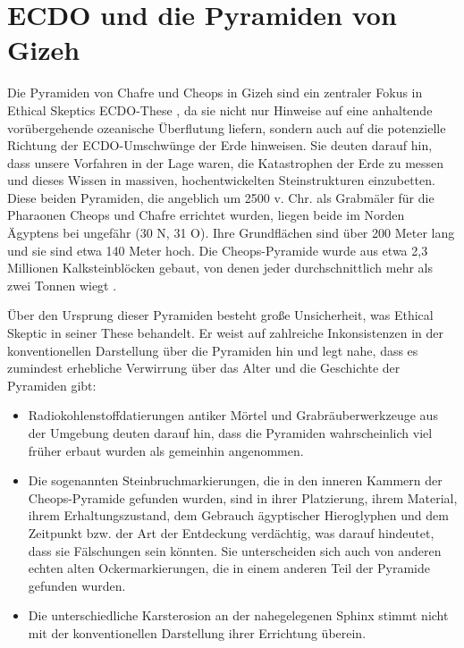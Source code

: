 \documentclass[10pt,twocolumn,letterpaper]{article}
\begin{document}
\section{ECDO und die Pyramiden von Gizeh}

Die Pyramiden von Chafre und Cheops in Gizeh sind ein zentraler Fokus in Ethical Skeptics ECDO-These \cite{27}, da sie nicht nur Hinweise auf eine anhaltende vorübergehende ozeanische Überflutung liefern, sondern auch auf die potenzielle Richtung der ECDO-Umschwünge der Erde hinweisen. Sie deuten darauf hin, dass unsere Vorfahren in der Lage waren, die Katastrophen der Erde zu messen und dieses Wissen in massiven, hochentwickelten Steinstrukturen einzubetten. Diese beiden Pyramiden, die angeblich um 2500 v. Chr. als Grabmäler für die Pharaonen Cheops und Chafre errichtet wurden, liegen beide im Norden Ägyptens bei ungefähr (30 N, 31 O). Ihre Grundflächen sind über 200 Meter lang und sie sind etwa 140 Meter hoch. Die Cheops-Pyramide wurde aus etwa 2,3 Millionen Kalksteinblöcken gebaut, von denen jeder durchschnittlich mehr als zwei Tonnen wiegt \cite{24, 25}.

Über den Ursprung dieser Pyramiden besteht große Unsicherheit, was Ethical Skeptic in seiner These behandelt. Er weist auf zahlreiche Inkonsistenzen in der konventionellen Darstellung über die Pyramiden hin und legt nahe, dass es zumindest erhebliche Verwirrung über das Alter und die Geschichte der Pyramiden gibt:

\begin{flushleft}
\begin{itemize}
    \item Radiokohlenstoffdatierungen antiker Mörtel und Grabräuberwerkzeuge aus der Umgebung deuten darauf hin, dass die Pyramiden wahrscheinlich viel früher erbaut wurden als gemeinhin angenommen.
    \item Die sogenannten Steinbruchmarkierungen, die in den inneren Kammern der Cheops-Pyramide gefunden wurden, sind in ihrer Platzierung, ihrem Material, ihrem Erhaltungszustand, dem Gebrauch ägyptischer Hieroglyphen und dem Zeitpunkt bzw. der Art der Entdeckung verdächtig, was darauf hindeutet, dass sie Fälschungen sein könnten. Sie unterscheiden sich auch von anderen echten alten Ockermarkierungen, die in einem anderen Teil der Pyramide gefunden wurden.
    \item Die unterschiedliche Karsterosion an der nahegelegenen Sphinx stimmt nicht mit der konventionellen Darstellung ihrer Errichtung überein.
\end{itemize}
\end{flushleft}
\end{document}
